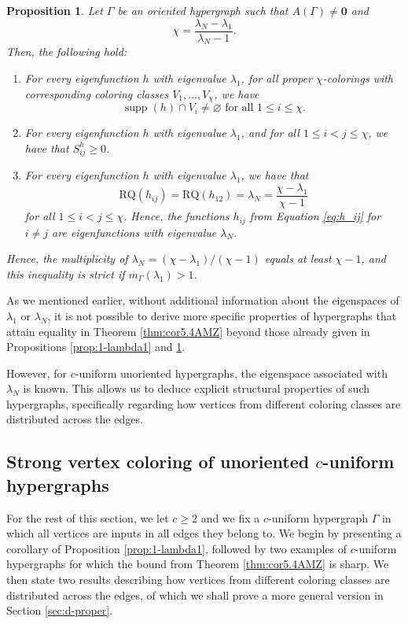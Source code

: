 \documentclass{article}
\newcommand{\RQ}{\textrm{RQ}}
\DeclareMathOperator{\supp}{supp}
\theoremstyle{plain}
\newtheorem{proposition}[theorem]{Proposition}
\theoremstyle{definition}
\theoremstyle{remark}
\begin{document}
\begin{proposition}\label{prop:lambdaN-1}
     Let $\Gamma$ be an oriented hypergraph such that $A(\Gamma)\neq \boldsymbol 0$ and  $$\chi=\frac{\lambda_N-\lambda_1}{\lambda_N-1}.$$ Then, the following hold:
    \begin{enumerate}
    \item For every eigenfunction $h$ with eigenvalue $\lambda_1$, for all proper $\chi$-colorings with corresponding coloring classes $V_1,\ldots,V_\chi$, we have
    \[
    \supp(h) \cap V_i \neq \varnothing \text{ for all } 1\leq i\leq \chi.
    \]
    \item For every eigenfunction $h$ with eigenvalue $\lambda_1$, and for all $1\leq i<j\leq \chi$, we have that $S^h_{ij}\geq 0$.
    \item For every eigenfunction $h$ with eigenvalue $\lambda_1$, we have that $$\RQ(h_{ij}) = \RQ(h_{12})=\lambda_N = \frac{\chi-\lambda_1}{\chi-1}$$ for all $1\leq i<j\leq \chi$. Hence, the functions $h_{ij}$ from Equation \eqref{eq:h_ij} for $i\neq j$ are eigenfunctions with eigenvalue $\lambda_N$.
\end{enumerate}
Hence, the multiplicity of $\lambda_N = (\chi-\lambda_1)/(\chi-1)$ equals at least $\chi-1$, and this inequality is strict if $m_\Gamma(\lambda_1)>1$.
\end{proposition}

As we mentioned earlier,  without additional information about the eigenspaces of $\lambda_1$ or $\lambda_N$, 
it is not possible to derive more specific properties of hypergraphs that attain equality in Theorem \ref{thm:cor5.4AMZ} beyond those already given in Propositions \ref{prop:1-lambda1} and \ref{prop:lambdaN-1}.


However, for $c$-uniform unoriented hypergraphs,
the eigenspace associated with $\lambda_N$ is known. This allows us to deduce explicit structural properties of such hypergraphs, specifically regarding how vertices from different coloring classes are distributed across the edges.

\subsection{Strong vertex coloring of unoriented \texorpdfstring{$c$}{c}-uniform hypergraphs}\label{sec:uniformhypergraphs}
For the rest of this section, we let $c\geq 2$ and we fix a $c$-uniform hypergraph $\Gamma$ in which all vertices are inputs in all edges they belong to. We begin by presenting a corollary of Proposition \ref{prop:1-lambda1}, followed by two examples of $c$-uniform hypergraphs for which the bound from Theorem \ref{thm:cor5.4AMZ} is sharp. We then state two results describing how vertices from different coloring classes are distributed across the edges, of which we shall prove a more general version in Section \ref{sec:d-proper}.\\
\end{document}
